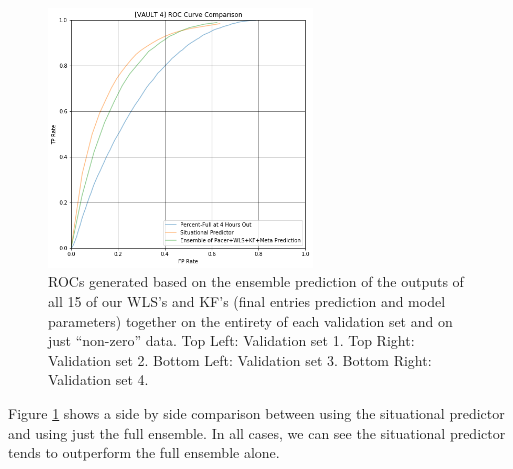 \begin{figure}[h]
\includegraphics[width=7cm]{body/results/Graphs/SituationalPredictions/Compare/v4.png}
\caption{ROCs generated based on the ensemble prediction of the outputs of all 15 of our WLS's and KF's (final entries prediction and model parameters) together on the entirety of each validation set and on just ``non-zero'' data. Top Left: Validation set 1. Top Right: Validation set 2. Bottom Left: Validation set 3. Bottom Right: Validation set 4.}
\label{fig:SitComp}
\end{figure}

Figure \ref{fig:SitComp} shows a side by side comparison between using the situational predictor and using just the full ensemble. In all cases, we can see the situational predictor tends to outperform the full ensemble alone.